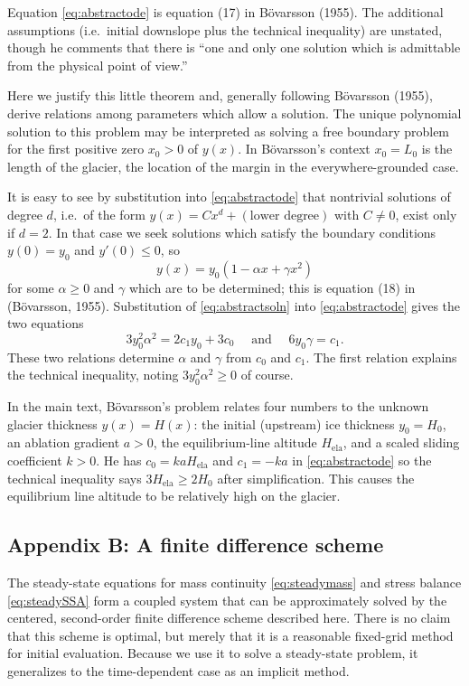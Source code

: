 \documentclass[twocolumn,letterpaper]{igs}
\renewcommand{\dh}{\fontencoding{T1}\selectfont{\symbol{240}}}
\newcommand{\bod}{B\"o\dh varsson\xspace}
\newcommand{\citebod}{B\"o\dh varsson (1955)\nocite{Bodvardsson}\xspace}
\newcommand{\citepbod}{(B\"o\dh varsson, 1955)\nocite{Bodvardsson}\xspace}
\newcommand{\Hela}{H_{\text{ela}}}
\begin{document}
Equation \eqref{eq:abstractode} is equation (17) in \citebod.  The additional assumptions (i.e.~initial downslope plus the technical inequality) are unstated, though he comments that there is ``one and only one solution which is admittable from the physical point of view.''

Here we justify this little theorem and, generally following \citebod, derive relations among parameters which allow a solution.  The unique polynomial solution to this problem may be interpreted as solving a free boundary problem for the first positive zero $x_0>0$ of $y(x)$.  In \bod's context $x_0=L_0$ is the length of the glacier, the location of the margin in the everywhere-grounded case.

It is easy to see by substitution into \eqref{eq:abstractode} that nontrivial solutions of degree $d$, i.e.~of the form $y(x) = C x^d + (\text{lower degree})$ with $C \ne 0$, exist only if $d=2$.  In that case we seek solutions which satisfy the boundary conditions $y(0)=y_0$ and $y'(0) \le 0$, so
\begin{equation}
y(x) = y_0(1 - \alpha x + \gamma x^2)  \label{eq:abstractsoln}
\end{equation}
for some $\alpha\ge 0$ and $\gamma$ which are to be determined; this is equation (18) in \citepbod.  Substitution of \eqref{eq:abstractsoln} into \eqref{eq:abstractode} gives the two equations
\begin{equation}
3 y_0^2 \alpha^2 = 2 c_1 y_0 + 3 c_0 \quad \text{ and } \quad 6 y_0 \gamma = c_1.  \label{eq:abstractrelations}
\end{equation}
These two relations determine $\alpha$ and $\gamma$ from $c_0$ and $c_1$.  The first relation explains the technical inequality, noting $3 y_0^2 \alpha^2 \ge 0$ of course.

In the main text, \bod's problem relates four numbers to the unknown glacier thickness $y(x)=H(x)$: the initial (upstream) ice thickness $y_0=H_0$, an ablation gradient $a>0$, the equilibrium-line altitude $\Hela$, and a scaled sliding coefficient $k>0$.  He has $c_0=k a \Hela$ and $c_1=-ka$ in \eqref{eq:abstractode} so the technical inequality says $3 \Hela \ge 2 H_0$ after simplification.  This causes the equilibrium line altitude to be relatively high on the glacier.


\subsection{Appendix B: A finite difference scheme}  The steady-state equations for mass continuity \eqref{eq:steadymass} and stress balance \eqref{eq:steadySSA} form a coupled system that can be approximately solved by the centered, second-order finite difference scheme described here.  There is no claim that this scheme is optimal, but merely that it is a reasonable fixed-grid method for initial evaluation.  Because we use it to solve a steady-state problem, it generalizes to the time-dependent case as an implicit method.
\end{document}
